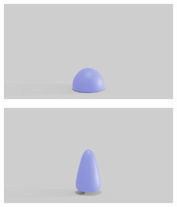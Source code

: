 \begin{figure}
\begin{subfigure}{.16\linewidth}
		\label{sfig:ball-0495-4}
	\end{subfigure}%
	\begin{subfigure}{.16\linewidth}
		\centering
		{\includegraphics[width=2.0\textwidth]{images/soft_ball/0495/0400.jpg}}
		\label{sfig:ball-0495-5}
	\end{subfigure}%
	\begin{subfigure}{.16\linewidth}
		\centering
		{\includegraphics[width=2.0\textwidth]{images/soft_ball/0495/0450.jpg}}
		\label{sfig:ball-0495-6}
	\end{subfigure}\hfill
	\begin{subfigure}{.03\linewidth}
	\end{subfigure}%
	\begin{subfigure}{.16\linewidth}
		\centering

\end{subfigure}
\end{figure}
